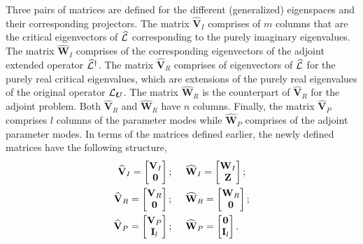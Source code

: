 Three pairs of matrices are defined for the different (generalized) eigenspaces and their corresponding projectors. The matrix $\mathbf{\widehat{V}}_{I}$ comprises of $m$ columns that are the critical eigenvectors of $\mathcal{\widehat{L}}$ corresponding to the purely imaginary eigenvalues. The matrix $\mathbf{\widehat{W}}_{I}$ comprises of the corresponding eigenvectors of the adjoint extended operator $\mathcal{\widehat{L}}^{\dagger}$. The matrix $\mathbf{\widehat{V}}_{R}$ comprises of eigenvectors of $\mathcal{\widehat{L}}$ for the purely real critical eigenvalues, which are extensions of the purely real eigenvalues of the original operator $\mathcal{L}_{\boldsymbol{U}}$. The matrix $\mathbf{\widehat{W}}_{R}$ is the counterpart of $\mathbf{\widehat{V}}_{R}$ for the adjoint problem. Both $\mathbf{\widehat{V}}_{R}$ and $\mathbf{\widehat{W}}_{R}$ have $n$ columns. 
Finally, the matrix $\mathbf{\widehat{V}}_{P}$ comprises $l$ columns of the parameter modes while $\mathbf{\widehat{W}}_{P}$ comprises of the adjoint parameter modes. In terms of the matrices defined earlier, the newly defined matrices have the following structure, 
\begin{subequations}
	\begin{align}
		\mathbf{\widehat{V}}_{I} = \begin{bmatrix}
			\mathbf{V}_{I} \\ 
			\mathbf{0}
		\end{bmatrix}; \hspace{5mm} &
		\mathbf{\widehat{W}}_{I} = \begin{bmatrix}
			\mathbf{W}_{I} \\ 
			\mathbf{Z}
		\end{bmatrix}; \\
		\mathbf{\widehat{V}}_{R} = \begin{bmatrix}
			\mathbf{V}_{R} \\ 
			\mathbf{0}
		\end{bmatrix}; \hspace{5mm} &
		\mathbf{\widehat{W}}_{R} = \begin{bmatrix}
			\mathbf{W}_{R} \\ 
			\mathbf{0}
		\end{bmatrix}; \\
		\mathbf{\widehat{V}}_{P} = \begin{bmatrix}
			\mathbf{V}_{P} \\ 
			\mathbf{I}_{l}
		\end{bmatrix}; \hspace{5mm} &
		\mathbf{\widehat{W}}_{P} = \begin{bmatrix}
			\mathbf{0} \\ 
			\mathbf{I}_{l}
		\end{bmatrix}.
	\end{align}
\end{subequations}
